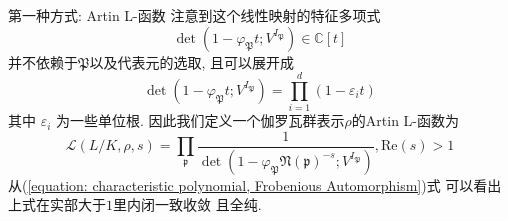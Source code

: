 \documentclass[aspectratio=169]{beamer}
\theoremstyle{definition}
\newcommand{\bb}[1]{\mathbb{#1}}
\begin{document}
\begin{frame}{第一种方式: Artin L-函数}
    注意到这个线性映射的特征多项式
    $$
        \operatorname{det}\left(1-\varphi_{\mathfrak{P}}t; V^{I_{\mathfrak{P}}}\right)\in \bb{C}[t]
    $$   
    并不依赖于$\mathfrak{P}$以及代表元的选取, 且可以展开成
    \begin{equation}
        \operatorname{det}\left(1-\varphi_{\mathfrak{P}}t ; V^{I_{\mathfrak{P}}}\right)=\prod_{i=1}^d\left(1-\varepsilon_i t\right)
        \label{equation: characteristic polynomial, Frobenious Automorphism}
    \end{equation}
    其中 $\varepsilon_i$ 为一些单位根.
    因此我们定义一个伽罗瓦群表示$\rho$的Artin L-函数为 
    $$
    \mathcal{L}(L/K, \rho, s)=\prod_{\mathfrak{p}} \frac{1}{\operatorname{det}(1-\varphi_{\mathfrak{P}}
    \mathfrak{N}(\mathfrak{p})^{-s} ; V^{I_{\mathfrak{P}}}) },\text{Re}(s)>1
    $$
    从(\ref{equation: characteristic polynomial, Frobenious Automorphism})式
    可以看出上式在实部大于$1$里内闭一致收敛
    且全纯. 
\end{frame}
\end{document}
